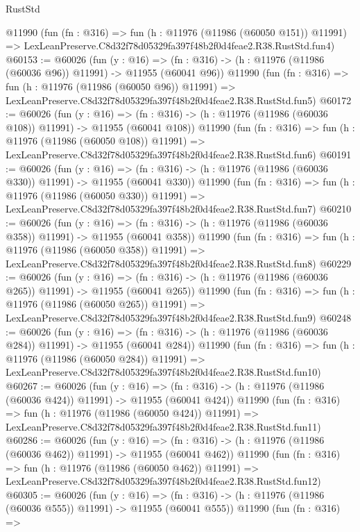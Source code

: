\begin{lexlean}{RustStd}
\begin{coremodule}
    @11990
    (fun (fn : @316) =>
    fun (h : @11976 (@11986 (@60050 @151)) @11991) =>
    LexLeanPreserve.C8d32f78d05329fa397f48b2f0d4feae2.R38.RustStd.fun4)
@60153 := @60026
    (fun (y : @16) =>
    (fn : @316) -> (h : @11976 (@11986 (@60036 @96)) @11991) -> @11955 (@60041 @96))
    @11990
    (fun (fn : @316) =>
    fun (h : @11976 (@11986 (@60050 @96)) @11991) =>
    LexLeanPreserve.C8d32f78d05329fa397f48b2f0d4feae2.R38.RustStd.fun5)
@60172 := @60026
    (fun (y : @16) =>
    (fn : @316) -> (h : @11976 (@11986 (@60036 @108)) @11991) -> @11955 (@60041 @108))
    @11990
    (fun (fn : @316) =>
    fun (h : @11976 (@11986 (@60050 @108)) @11991) =>
    LexLeanPreserve.C8d32f78d05329fa397f48b2f0d4feae2.R38.RustStd.fun6)
@60191 := @60026
    (fun (y : @16) =>
    (fn : @316) -> (h : @11976 (@11986 (@60036 @330)) @11991) -> @11955 (@60041 @330))
    @11990
    (fun (fn : @316) =>
    fun (h : @11976 (@11986 (@60050 @330)) @11991) =>
    LexLeanPreserve.C8d32f78d05329fa397f48b2f0d4feae2.R38.RustStd.fun7)
@60210 := @60026
    (fun (y : @16) =>
    (fn : @316) -> (h : @11976 (@11986 (@60036 @358)) @11991) -> @11955 (@60041 @358))
    @11990
    (fun (fn : @316) =>
    fun (h : @11976 (@11986 (@60050 @358)) @11991) =>
    LexLeanPreserve.C8d32f78d05329fa397f48b2f0d4feae2.R38.RustStd.fun8)
@60229 := @60026
    (fun (y : @16) =>
    (fn : @316) -> (h : @11976 (@11986 (@60036 @265)) @11991) -> @11955 (@60041 @265))
    @11990
    (fun (fn : @316) =>
    fun (h : @11976 (@11986 (@60050 @265)) @11991) =>
    LexLeanPreserve.C8d32f78d05329fa397f48b2f0d4feae2.R38.RustStd.fun9)
@60248 := @60026
    (fun (y : @16) =>
    (fn : @316) -> (h : @11976 (@11986 (@60036 @284)) @11991) -> @11955 (@60041 @284))
    @11990
    (fun (fn : @316) =>
    fun (h : @11976 (@11986 (@60050 @284)) @11991) =>
    LexLeanPreserve.C8d32f78d05329fa397f48b2f0d4feae2.R38.RustStd.fun10)
@60267 := @60026
    (fun (y : @16) =>
    (fn : @316) -> (h : @11976 (@11986 (@60036 @424)) @11991) -> @11955 (@60041 @424))
    @11990
    (fun (fn : @316) =>
    fun (h : @11976 (@11986 (@60050 @424)) @11991) =>
    LexLeanPreserve.C8d32f78d05329fa397f48b2f0d4feae2.R38.RustStd.fun11)
@60286 := @60026
    (fun (y : @16) =>
    (fn : @316) -> (h : @11976 (@11986 (@60036 @462)) @11991) -> @11955 (@60041 @462))
    @11990
    (fun (fn : @316) =>
    fun (h : @11976 (@11986 (@60050 @462)) @11991) =>
    LexLeanPreserve.C8d32f78d05329fa397f48b2f0d4feae2.R38.RustStd.fun12)
@60305 := @60026
    (fun (y : @16) =>
    (fn : @316) -> (h : @11976 (@11986 (@60036 @555)) @11991) -> @11955 (@60041 @555))
    @11990
    (fun (fn : @316) =>

\end{coremodule}
\end{lexlean}
